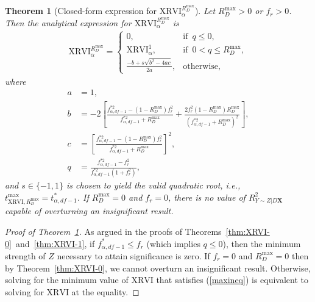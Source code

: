 \documentclass[sts]{imsart}
\theoremstyle{plain}
\newtheorem{theorem}{Theorem}
\theoremstyle{definition}
\newcommand{\df}{df}
\newcommand{\Ry}{R^2_{Y\sim Z | D\mathbf{X}}}
\newcommand{\Rdmax}{R^{\max }_{D}}
\newcommand{\fstar}{f^*_{\alpha, \df-1}}
\newcommand{\fstarsq}{f^{* 2}_{\alpha, \df-1}}
\newcommand{\tstar}{t^*_{\alpha, \df-1}}
\newcommand{\XRVI}{\text{XRVI}}
\begin{document}
\begin{appendix}
\begin{theorem}[Closed-form expression for $\XRVI^{\Rdmax}_{\alpha}$]
\label{thm:xriv-r}
%
Let $\Rdmax > 0$ or $f_{r} > 0$. Then the analytical expression for $\XRVI^{\Rdmax}_{\alpha}$ is
\begin{align*}
    \XRVI^{\Rdmax}_{\alpha} =
    \begin{cases}
        0, &\text{if} \enspace q \leq 0,\\
        \XRVI^{1}_{\alpha}, &\text{if} \enspace {0 < q \leq \Rdmax}, \\
        \frac{-b + s\sqrt{b^2 - 4ac}}{2a}, &\text{otherwise},
    \end{cases}
\end{align*}
where
\begin{align}
    a &= 1 \label{a}, \\ 
    b &= {\scriptstyle - 2\left[ \frac{\fstarsq - (1-\Rdmax)f_r^2}{\fstarsq + \Rdmax} + \frac{2f_r^2(1-\Rdmax)\Rdmax}{(\fstarsq + \Rdmax)^2} \right]}, \label{b} \\
    c &= { \left[\frac{\fstarsq - (1-\Rdmax)f_r^2}{\fstarsq + \Rdmax}\right]^2,} \label{c} \\ 
    q &= { \frac{\fstarsq - f_r^2}{\fstarsq (1+ f_r^2)}},
\end{align}
and $s\in \{-1, 1\}$ is chosen to yield the valid quadratic root, i.e., $t_{\XRVI,\Rdmax}^{\max}=\tstar$. %
If $\Rdmax = 0$ and $f_{r} = 0$, there is no value of $\Ry$ capable of overturning an insignificant result.
\end{theorem}

\begin{proof}[Proof of Theorem~\ref{thm:xriv-r}]
As argued in the proofs of Theorems~\ref{thm:XRVI-0}~and~\ref{thm:XRVI-1}, if $\fstar \leq f_{r} $ (which implies $q\leq 0$), then the minimum strength of $Z$  necessary to attain significance is zero.  If $f_r = 0$ and $\Rdmax = 0$ then by Theorem~\ref{thm:XRVI-0}, we cannot overturn an insignificant result. Otherwise, solving for the minimum value of $\XRVI$ that satisfies (\ref{maxineq}) is equivalent to solving for $\XRVI$ at the equality. 


\end{proof}
\end{appendix}
\end{document}
